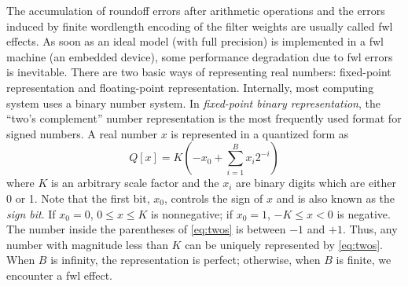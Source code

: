 \documentclass{article}
\begin{document}
The accumulation of roundoff errors after arithmetic operations and the errors induced by finite wordlength encoding of the filter weights are usually called \gls{fwl} effects.
As soon as an ideal model (with full precision) is implemented in a \gls{fwl} machine (an embedded device), some performance degradation due to \gls{fwl} errors is inevitable.
There are two basic ways of representing real numbers: fixed-point representation and floating-point representation.
Internally, most computing system uses a binary number system.
In \textit{fixed-point binary representation}, the ``two's complement'' number representation is the most frequently used format for signed numbers.
A real number $x$ is represented in a quantized form as
%
\begin{equation}
Q[x] = K \left( -x_0 + \sum_{i=1}^B x_i 2^{-i} \right)
\label{eq:twos}
\end{equation}
%
where $K$ is  an arbitrary scale factor and the $x_i$ are binary digits which are either 0 or 1.
Note that the first bit, $x_0$, controls the sign of $x$ and is also known as the \textit{sign bit}.
If $x_0 = 0$, $0 \leq x \leq K$ is nonnegative; if $x_0 =1$, $-K \leq x < 0$ is negative.
The number inside the parentheses of \eqref{eq:twos} is between $-1$ and $+1$.
Thus, any number with magnitude less than $K$ can be uniquely represented by \eqref{eq:twos}.
When $B$ is infinity, the representation is perfect; otherwise, when $B$ is finite, we encounter a \gls{fwl} effect.
\end{document}
